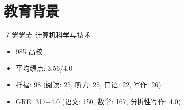 \section{教育背景}
\textit{工学学士}\ 计算机科学与技术
\begin{itemize}
  \item 985 高校
  \item 平均绩点: 3.56/4.0
  \item 托福: 98 (阅读: 25, 听力: 25, 口语: 22, 写作: 26)
  \item GRE: 317+4.0 (语文: 150, 数学: 167, 分析性写作: 4.0)
\end{itemize}